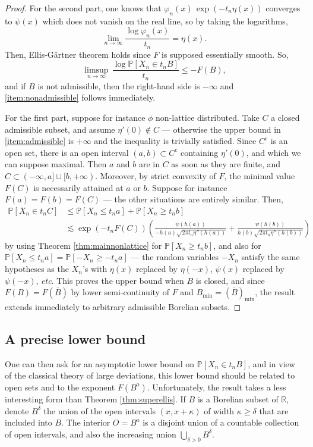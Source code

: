 \documentclass[12pt,a4paper,reqno]{amsart}
\theoremstyle{remark}
\newcommand{\R}{\mathbb{R}}
\newcommand{\proba}{\mathbb{P}}
\begin{document}
\begin{proof}
For the second part, one knows that $\varphi_{n}(x)\,\exp(-t_{n}\eta(x))$ converges to $\psi(x)$ which does not vanish on the real line, so by taking the logarithms, 
$$\lim_{n \to \infty} \frac{\log \varphi_{n}(x)}{t_{n}}=\eta(x).$$
Then, Ellis-G\"artner theorem holds since $F$ is supposed essentially smooth. So, $$\limsup_{n \to \infty} \,\frac{\log \proba[X_{n} \in t_{n}B]}{t_{n}} \leq -F(B),$$ and if $B$ is not admissible, then the right-hand side is $-\infty$ and \eqref{item:nonadmissible} follows immediately.\bigskip

For the first part, suppose for instance $\phi$ non-lattice distributed. Take $C$ a closed admissible subset, and assume $\eta'(0) \notin C$ --- otherwise the upper bound in \eqref{item:admissible} is $+\infty$ and the inequality is trivially satisfied. Since $C^{\mathrm{c}}$ is an open set, there is an open interval $(a,b) \subset C^{\mathrm{c}}$ containing $\eta'(0)$, and which we can suppose maximal. Then $a$ and $b$ are in $C$ as soon as they are finite, and $C \subset (-\infty,a] \sqcup [b,+\infty)$. Moreover, by strict convexity of $F$, the minimal value $F(C)$ is necessarily attained at $a$ or $b$. Suppose for instance $F(a)=F(b)=F(C)$ --- the other situations are entirely similar. Then,
\begin{align*}\proba[X_{n} \in t_{n}C] &\leq \proba[X_{n} \leq t_{n}a]+\proba[X_{n}\geq t_{n}b] \\
&\lesssim \exp(-t_{n}F(C)) \left(\frac{\psi(h(a))}{-h(a)\sqrt{2\pi t_{n}\eta''(h(a))}}+\frac{\psi(h(b))}{h(b)\sqrt{2\pi t_{n}\eta''(h(b))}}\right) 
\end{align*}
by using Theorem \ref{thm:mainnonlattice} for $\proba[X_{n} \geq t_{n}b]$, and also for $\proba[X_{n}\leq t_{n}a]=\proba[-X_{n} \geq -t_{n}a]$ --- the random variables $-X_{n}$ satisfy the same hypotheses as the $X_{n}$'s with $\eta(x)$ replaced by $\eta(-x)$, $\psi(x)$ replaced by $\psi(-x)$, \emph{etc}. This proves the upper bound when $B$ is closed, and since $F(B)=F(\overline{B})$ by lower semi-continuity of $F$ and $B_{\min}=(\overline{B})_{\min}$, the result extends immediately to arbitrary admissible Borelian subsets.
\end{proof}\bigskip



\subsection{A precise lower bound}
One can then ask for an asymptotic lower bound on $\proba[X_{n} \in t_{n} B]$, and in view of the classical theory of large deviations, this lower bound should be related to open sets and to the exponent $F(B^{\mathrm{o}})$. Unfortunately, the result takes a less interesting form than Theorem \ref{thm:superellis}. If $B$ is a Borelian subset of $\R$, denote $B^{\delta}$ the union of the open intervals $(x,x+\kappa)$ of width $\kappa \geq \delta$ that are included into $B$. The interior $O=B^{\mathrm{o}}$ is a disjoint union of a countable collection of open intervals, and also the increasing union $\bigcup_{\delta >0}B^{\delta}$. 
\end{document}
